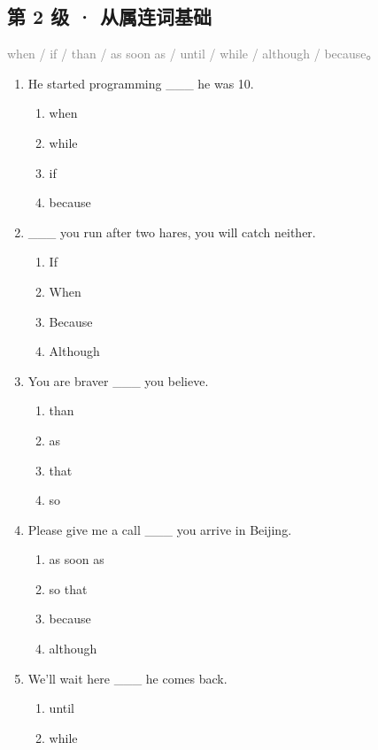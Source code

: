 \documentclass[11pt,a4paper]{ctexart}
\begin{document}
\subsection*{第 2 级 · 从属连词基础}
\noindent\textcolor{gray}{when / if / than / as soon as / until / while / although / because。}\par\smallskip
\begin{enumerate}[leftmargin=*,itemsep=4pt]
\item He started programming \_\_\_ he was 10.
\begin{enumerate}[label=\Alph*.,leftmargin=2em,itemsep=1pt,topsep=2pt]
\item when
\item while
\item if
\item because
\end{enumerate}
\item \_\_\_ you run after two hares, you will catch neither.
\begin{enumerate}[label=\Alph*.,leftmargin=2em,itemsep=1pt,topsep=2pt]
\item If
\item When
\item Because
\item Although
\end{enumerate}
\item You are braver \_\_\_ you believe.
\begin{enumerate}[label=\Alph*.,leftmargin=2em,itemsep=1pt,topsep=2pt]
\item than
\item as
\item that
\item so
\end{enumerate}
\item Please give me a call \_\_\_ you arrive in Beijing.
\begin{enumerate}[label=\Alph*.,leftmargin=2em,itemsep=1pt,topsep=2pt]
\item as soon as
\item so that
\item because
\item although
\end{enumerate}
\item We’ll wait here \_\_\_ he comes back.
\begin{enumerate}[label=\Alph*.,leftmargin=2em,itemsep=1pt,topsep=2pt]
\item until
\item while

\end{enumerate}
\end{enumerate}
\end{document}
